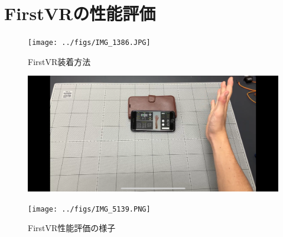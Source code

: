 \documentclass{ltjsreport}
\begin{document}
	\section{FirstVRの性能評価}

		\begin{figure}[H]
		\centering
		\texttt{[image: ../figs/IMG\_1386.JPG]}
		\caption{FirstVR装着方法}
		\label{}
		\end{figure}

		\begin{figure}[H]
		\centering
		\begin{minipage}{0.4\columnwidth}
		\centering
		\includegraphics[width = \columnwidth]{../figs/IMG_5138.PNG}
		\end{minipage}
		\hspace{0.04\columnwidth}
		\begin{minipage}{0.4\columnwidth}
		\centering
		\texttt{[image: ../figs/IMG\_5139.PNG]}
		\end{minipage}
		\caption{FirstVR性能評価の様子}
		\end{figure}
		
\end{document}
